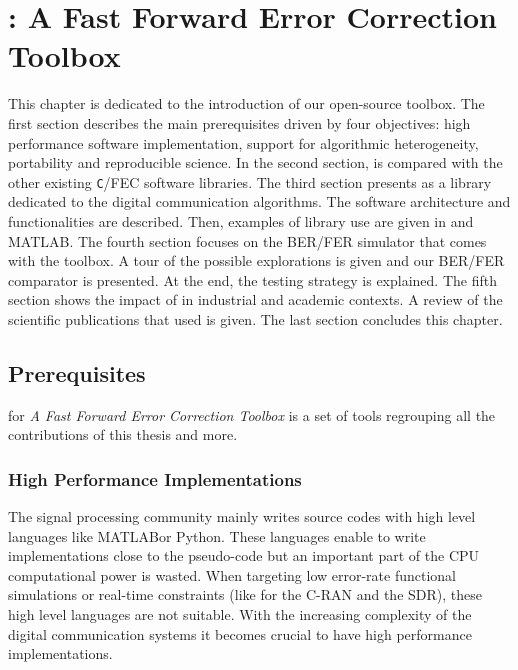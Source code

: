 
\renewcommand{\curChapter}{main/chapter3}

\chapter{\AFFECT: A Fast Forward Error Correction Toolbox}
\label{chap:aff3ct}

This chapter is dedicated to the introduction of our \AFFECT open-source
toolbox. The first section describes the main prerequisites driven by four
objectives: high performance software implementation, support for algorithmic
heterogeneity, portability and reproducible science. In the second section,
\AFFECT is compared with the other existing \verb|C|/\Cxx FEC software
libraries. The third section presents \AFFECT as a library dedicated to the
digital communication algorithms. The software architecture and functionalities
are described. Then, examples of library use are given in \Cxx and MATLAB\R. The
fourth section focuses on the \AFFECT BER/FER simulator that comes with the
toolbox. A tour of the possible explorations is given and our BER/FER comparator
is presented. At the end, the \AFFECT testing strategy is explained. The fifth
section shows the impact of \AFFECT in industrial and academic contexts. A
review of the scientific publications that used \AFFECT is given. The last
section concludes this chapter.

\vspace*{\fill}
\minitoccustom
\vspace*{\fill}

\newpage
\section{Prerequisites}

\AFFECT for \emph{A Fast Forward Error Correction Toolbox} is a set of tools
regrouping all the contributions of this thesis and more.

\subsection{High Performance Implementations}

The signal processing community mainly writes source codes with high level
languages like MATLAB\R or Python. These languages enable to write
implementations close to the pseudo-code but an important part of the CPU
computational power is wasted. When targeting low error-rate functional
simulations or real-time constraints (like for the C-RAN and the SDR), these
high level languages are not suitable. With the increasing complexity of the
digital communication systems it becomes crucial to have high performance
implementations.

